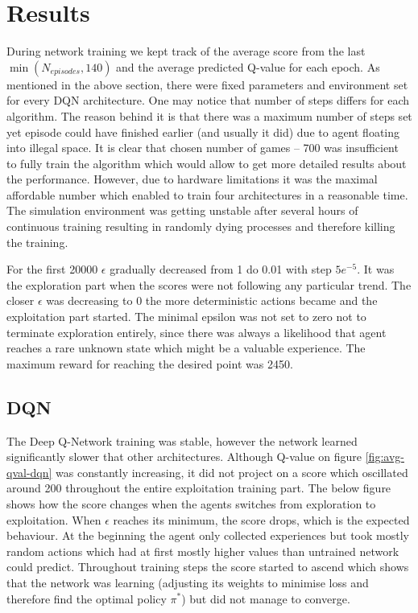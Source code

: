 \chapter{Results}
\label{cha:results}

During network training we kept track of the average score from the last $\min(N_{episodes}, 140)$ and the average predicted Q-value
for each epoch. As mentioned in the above section, there were fixed parameters and environment set for every DQN architecture. One may
notice that number of steps differs for each algorithm. The reason behind it is that there was a maximum number of steps set yet
episode could have finished earlier (and usually it did)  due to agent floating into illegal space. It is clear that chosen number of
games -- 700 was insufficient to fully train the algorithm which would allow to get more detailed results about the performance.
However, due to hardware limitations it was the maximal affordable number which enabled to train four architectures in a reasonable
time. The simulation environment was getting unstable after several hours of continuous training resulting in randomly dying processes
and therefore killing the training.

For the first 20000 $\epsilon$ gradually decreased from 1 do 0.01 with step $5e^{-5}$. It was the exploration part when the scores were
not following any particular trend. The closer $\epsilon$ was decreasing to 0 the more deterministic actions became and the
exploitation part started. The minimal epsilon was not set to zero not to terminate exploration entirely, since there was always a
likelihood that agent reaches a rare unknown state which might be a valuable experience. The maximum reward for reaching the desired
point was 2450.

\section{DQN}
\label{sec:results-dqn}

The Deep Q-Network training was stable, however the network learned significantly slower that other architectures. Although Q-value on
figure \ref{fig:avg-qval-dqn} was constantly increasing, it did not project on a score which oscillated around 200 throughout the
entire exploitation training part. The below figure shows how the score changes when the agents switches from exploration to
exploitation. When $\epsilon$ reaches its minimum, the score drops, which is the expected behaviour. At the beginning the agent only
collected experiences but took mostly random actions which had at first mostly higher values than untrained network could predict.
Throughout training steps the score started to ascend which shows that the network was learning (adjusting its weights to minimise loss
and therefore find the optimal policy $\pi^*$) but did not manage to converge.

